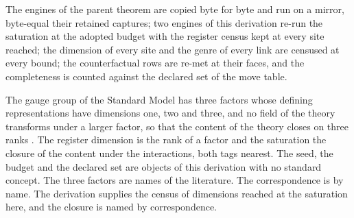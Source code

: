 \chdeps{}{}
The engines of the parent theorem are copied byte for byte and run on a mirror, byte-equal their retained captures; two engines of this derivation re-run the saturation at the adopted budget with the register census kept at every site reached; the dimension of every site and the genre of every link are censused at every bound; the counterfactual rows are re-met at their faces, and the completeness is counted against the declared set of the move table.

\begin{chbridge}
The gauge group of the Standard Model has three factors whose defining representations have dimensions one, two and three, and no field of the theory transforms under a larger factor, so that the content of the theory closes on three ranks \cite{Glashow1961,GeorgiGlashow1974}.
The register dimension is the rank of a factor and the saturation the closure of the content under the interactions, both tags nearest. The seed, the budget and the declared set are objects of this derivation with no standard concept. The three factors are names of the literature. The correspondence is by name. The derivation supplies the census of dimensions reached at the saturation here, and the closure is named by correspondence.
\end{chbridge}
